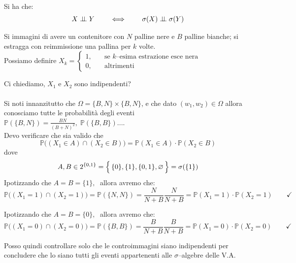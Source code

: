 \begin{proposizione}
    Si ha che:
    \[X\mathrel{\perp\!\!\!\perp} Y\qquad\iff\qquad \sigma(X)\mathrel{\perp\!\!\!\perp} \sigma(Y)\]
\end{proposizione}

\begin{esempio}
    Si immagini di avere un contenitore con $N$ palline nere e $B$ palline bianche; si estragga con reimmissione una pallina per $k$ volte.\\
    Possiamo definire $X_k = \begin{cases}
        1, \quad &\text{se $k$--esima estrazione esce nera}\\
        0, & \text{altrimenti}
    \end{cases}$

    \medskip
    \noindent Ci chiediamo, $X_1$ e $X_2$ sono indipendenti?\\
    \\
    Si noti innanzitutto che $\Omega= \{B, N\}\times\{B, N\}$, e che dato $(w_1, w_2)\in\Omega$ allora conosciamo tutte le probabilità degli eventi $\mathbb{P}(\{B, N\}) = \frac{BN}{(B+N)^2},\; \mathbb{P}(\{B, B\}) ...$.\\
    Devo verificare che sia valido che
    \[\mathbb{P}\big((X_1\in A)\cap (X_2\in B)\big) = \mathbb{P}(X_1\in A)\cdot \mathbb{P}(X_2\in B)\]
    dove \[A, B\in2^{\{0, 1\}} = \Bigl\{\,\{0\}, \{1\}, \{0, 1\}, \varnothing\,\Bigr\} = \sigma(\{1\})\]
    Ipotizzando che $A=B=\{1\}, \;$ allora avremo che:
     \[\mathbb{P}\big((X_1=1)\cap (X_2=1)\big) = \mathbb{P}(\{N, N\}) = \frac{N}{N+B} \frac{N}{N+B} = \mathbb{P}({X_1=1})\cdot\mathbb{P}(X_2 = 1)\qquad \checkmark\]

    Ipotizzando che $A=B=\{0\}, \;$ allora avremo che:
     \[\mathbb{P}\big((X_1=0)\cap (X_2=0)\big) = \mathbb{P}(\{B, B\}) = \frac{B}{N+B} \frac{B}{N+B} = \mathbb{P}({X_1=0})\cdot\mathbb{P}(X_2 = 0)\qquad \checkmark\]

     Posso quindi controllare solo che le controimmagini siano indipendenti per concludere che lo siano tutti gli eventi appartenenti alle $\sigma$--algebre delle 
     V.A.
\end{esempio}

